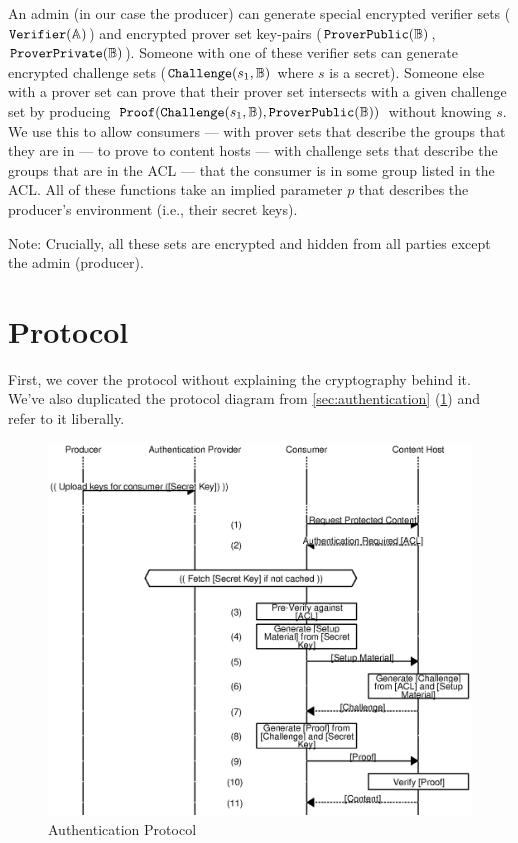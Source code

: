 \documentclass[pdftex,12pt,a4papaer,twoside,notitlepage]{report}
\DeclareMathOperator{\Proof}{\mathtt{Proof}}
\begin{document}
An admin (in our case the producer) can generate special encrypted verifier sets
($\operatorname{\mathtt{Verifier}}(\mathbb{A})$) and encrypted prover set key-pairs ($\operatorname{\mathtt{ProverPublic}}(\mathbb{B})$, $\operatorname{\mathtt{ProverPrivate}}(\mathbb{B})$). Someone with one of
these verifier sets can generate encrypted challenge sets ($\operatorname{\mathtt{Challenge}}(s_1, \mathbb{B})$ where $s$ is a
secret). Someone else with a prover set can prove that their prover set
intersects with a given challenge set by producing $\Proof(\Cv, \allowbreak\Pv)$
without knowing $s$. We use this to allow consumers --- with prover sets that
describe the groups that they are in --- to prove to content hosts --- with
challenge sets that describe the groups that are in the ACL --- that the
consumer is in some group listed in the ACL. All of these functions take an
implied parameter $p$ that describes the producer's environment (i.e., their
secret keys).

Note: Crucially, all these sets are encrypted and hidden from all parties except
the admin (producer).

\section{Protocol}
\label{sec:proto-detail}

First, we cover the protocol without explaining the cryptography behind it.
We've also duplicated the protocol diagram from \cref{sec:authentication}
(\cref{fig:auth2}) and refer to it liberally.

\begin{figure}
    \includegraphics{auth.eps}
    \caption{Authentication Protocol}
    \label{fig:auth2}
\end{figure}
\end{document}
